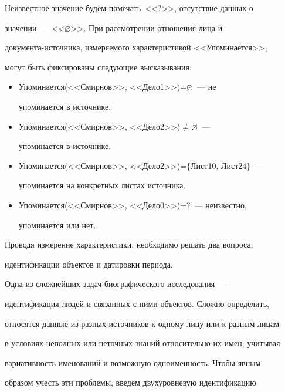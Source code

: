      


     Неизвестное значение будем помечать~<<?>>, отсутствие данных о 


значении~--- <<$\varnothing$>>.   При рассмотрении отношения лица и 


документа-источника, измеряемого характеристикой <<Упоминается>>,  


могут быть фиксированы следующие высказывания:


     \begin{itemize}


\item Упоминается(<<Смирнов>>, <<Дело1>>)\;=\;$\varnothing$~--- не 


упоминается в источнике.


\item 


Упоминается(<<Смирнов>>, <<Дело2>>)\;$\not=$\;$\varnothing$~--- 


упоминается в источнике.


\item Упоминается(<<Смирнов>>, <<Дело2>>)\;=\;$\{$Лист10, Лист24$\}$~---


упоминается на конкретных листах источника.


\item Упоминается(<<Смирнов>>, <<Дело0>>)\;=\;?~--- неизвестно, 


упоминается или нет.


\end{itemize}





     Проводя измерение характеристики, необходимо решать два вопроса: 


идентификации объектов и датировки периода.


     


     Одна из сложнейших задач биографического исследования~--- 


идентификация людей и связанных с ними объектов.  Сложно определить, 


относятся данные из разных источников к одному лицу или к разным лицам 


в условиях неполных или неточных знаний относительно их имен, учитывая 


вариативность именований и возможную одноименность. Чтобы явным 


образом учесть эти проблемы, введем двухуровневую идентификацию 


